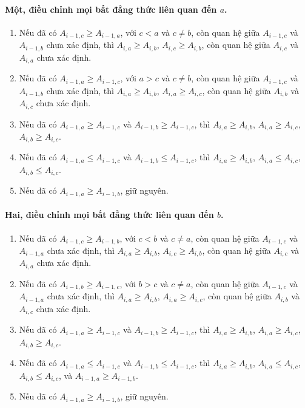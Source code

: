 \documentclass[11pt]{article}
\begin{document}
\paragraph{Một, điều chỉnh mọi bất đẳng thức liên quan đến \(a\).}
\begin{enumerate}
  \item Nếu đã có \(A_{i-1,c}\ge A_{i-1,a}\), với \(c<a\) và \(c\ne b\), còn
  quan hệ giữa \(A_{i-1,c}\) và \(A_{i-1,b}\) chưa xác định, thì
  \(A_{i,a}\ge A_{i,b}\), \(A_{i,c}\ge A_{i,b}\), còn quan hệ giữa
  \(A_{i,c}\) và \(A_{i,a}\) chưa xác định.
  \item Nếu đã có \(A_{i-1,a}\ge A_{i-1,c}\), với \(a>c\) và \(c\ne b\), còn
  quan hệ giữa \(A_{i-1,c}\) và \(A_{i-1,b}\) chưa xác định, thì
  \(A_{i,a}\ge A_{i,b}\), \(A_{i,a}\ge A_{i,c}\), còn quan hệ giữa
  \(A_{i,b}\) và \(A_{i,c}\) chưa xác định.
  \item Nếu đã có \(A_{i-1,a}\ge A_{i-1,c}\) và
  \(A_{i-1,b}\ge A_{i-1,c}\), thì \(A_{i,a}\ge A_{i,b}\),
  \(A_{i,a}\ge A_{i,c}\), \(A_{i,b}\ge A_{i,c}\).
  \item Nếu đã có \(A_{i-1,a}\le A_{i-1,c}\) và
  \(A_{i-1,b}\le A_{i-1,c}\), thì \(A_{i,a}\ge A_{i,b}\),
  \(A_{i,a}\le A_{i,c}\), \(A_{i,b}\le A_{i,c}\).
  \item Nếu đã có \(A_{i-1,a}\ge A_{i-1,b}\), giữ nguyên.
\end{enumerate}

\paragraph{Hai, điều chỉnh mọi bất đẳng thức liên quan đến \(b\).}
\begin{enumerate}
  \item Nếu đã có \(A_{i-1,c}\ge A_{i-1,b}\), với \(c<b\) và \(c\ne a\), còn
  quan hệ giữa \(A_{i-1,c}\) và \(A_{i-1,a}\) chưa xác định, thì
  \(A_{i,a}\ge A_{i,b}\), \(A_{i,c}\ge A_{i,b}\), còn quan hệ giữa
  \(A_{i,c}\) và \(A_{i,a}\) chưa xác định.
  \item Nếu đã có \(A_{i-1,b}\ge A_{i-1,c}\), với \(b>c\) và \(c\ne a\), còn
  quan hệ giữa \(A_{i-1,c}\) và \(A_{i-1,a}\) chưa xác định, thì
  \(A_{i,a}\ge A_{i,b}\), \(A_{i,a}\ge A_{i,c}\), còn quan hệ giữa
  \(A_{i,b}\) và \(A_{i,c}\) chưa xác định.
  \item Nếu đã có \(A_{i-1,a}\ge A_{i-1,c}\) và
  \(A_{i-1,b}\ge A_{i-1,c}\), thì \(A_{i,a}\ge A_{i,b}\),
  \(A_{i,a}\ge A_{i,c}\), \(A_{i,b}\ge A_{i,c}\).
  \item Nếu đã có \(A_{i-1,a}\le A_{i-1,c}\) và
  \(A_{i-1,b}\le A_{i-1,c}\), thì \(A_{i,a}\ge A_{i,b}\),
  \(A_{i,a}\le A_{i,c}\), \(A_{i,b}\le A_{i,c}\), và
  \(A_{i-1,a}\ge A_{i-1,b}\).
  \item Nếu đã có \(A_{i-1,a}\ge A_{i-1,b}\), giữ nguyên.
\end{enumerate}
\end{document}
